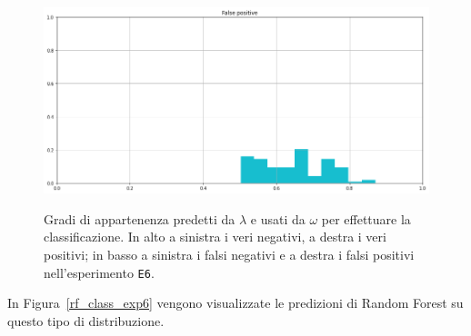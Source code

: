 \documentclass[12pt]{report}
\theoremstyle{definition}
\begin{document}
\begin{figure}
\begin{minipage}{0.48\textwidth}
   \end{minipage}
   \begin{minipage}{0.48\textwidth}
     \includegraphics[width=\linewidth]{images/experiment_beta05_sovrapposti/fp.png}\label{fp_b05s}
   \end{minipage}
   \caption{Gradi di appartenenza predetti da $\lambda$ e usati da $\omega$ per effettuare la classificazione. In alto a sinistra i veri negativi, a destra i veri positivi; in basso a sinistra i falsi negativi e a destra i falsi positivi nell'esperimento \texttt{E6}.}
   \label{4cases_exp6}
\end{figure}
In Figura~\ref{rf_class_exp6} vengono visualizzate le predizioni di Random Forest su questo tipo di distribuzione.
\end{document}
